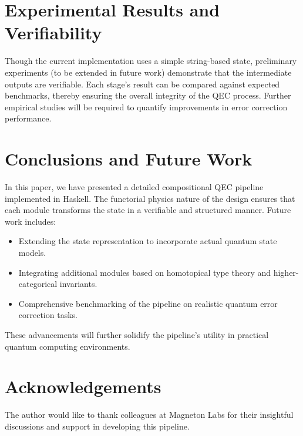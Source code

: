 \documentclass[11pt]{article}
\begin{document}
\section{Experimental Results and Verifiability}
Though the current implementation uses a simple string-based state, preliminary experiments (to be extended in future work) demonstrate that the intermediate outputs are verifiable. Each stage’s result can be compared against expected benchmarks, thereby ensuring the overall integrity of the QEC process. Further empirical studies will be required to quantify improvements in error correction performance.

\section{Conclusions and Future Work}
In this paper, we have presented a detailed compositional QEC pipeline implemented in Haskell. The functorial physics nature of the design ensures that each module transforms the state in a verifiable and structured manner. Future work includes:
\begin{itemize}
    \item Extending the state representation to incorporate actual quantum state models.
    \item Integrating additional modules based on homotopical type theory and higher-categorical invariants.
    \item Comprehensive benchmarking of the pipeline on realistic quantum error correction tasks.
\end{itemize}
These advancements will further solidify the pipeline's utility in practical quantum computing environments.

\section{Acknowledgements}
The author would like to thank colleagues at Magneton Labs for their insightful discussions and support in developing this pipeline.



\end{document}

